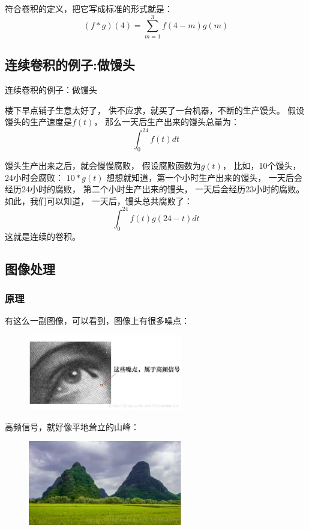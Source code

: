 符合卷积的定义，把它写成标准的形式就是：
\begin{equation}
  (f*g)(4) = \sum_{m=1}^{3}f(4-m)g(m)
\end{equation}

\subsection{连续卷积的例子:做馒头}
连续卷积的例子：做馒头

楼下早点铺子生意太好了，%
供不应求，就买了一台机器，不断的生产馒头。%
假设馒头的生产速度是$f(t)$，%
那么一天后生产出来的馒头总量为：%
\begin{equation}
  \int_{0}^{24}f(t)dt
\end{equation}

馒头生产出来之后，就会慢慢腐败，%
假设腐败函数为$g(t)$，%
比如，10个馒头，24小时会腐败：%
$10*g(t)$
想想就知道，第一个小时生产出来的馒头，%
一天后会经历24小时的腐败，%
第二个小时生产出来的馒头，%
一天后会经历23小时的腐败。%
如此，我们可以知道，%
一天后，馒头总共腐败了：%
\begin{equation}
  \int_{0}^{24}f(t)g(24-t)dt
\end{equation}
这就是连续的卷积。

\subsection{图像处理 }
\subsubsection{原理}
有这么一副图像，可以看到，图像上有很多噪点：
\begin{figure}[hpbt]
  \centering
  \includegraphics[width=0.6\textwidth]{图像及其数学与物理背景/Figures/图像卷积原理1}
\end{figure}

高频信号，就好像平地耸立的山峰：
\begin{figure}[hpbt]
  \centering
  \includegraphics[width=0.6\textwidth]{图像及其数学与物理背景/Figures/图像卷积原理2}
\end{figure}

